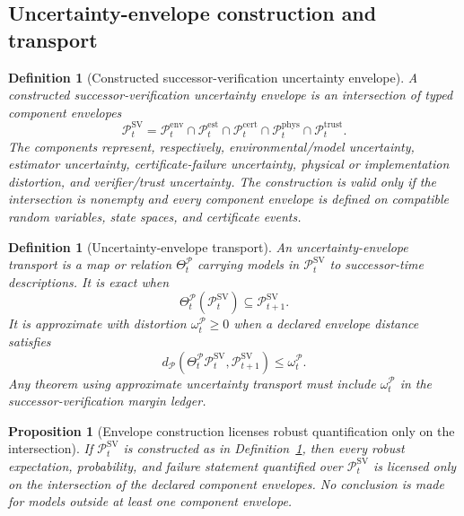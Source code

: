 \documentclass[11pt]{article}
\newtheorem{proposition}[theorem]{Proposition}
\newtheorem{definition}[theorem]{Definition}
\newcommand{\Pcal}{\mathcal{P}}
\newcommand{\1}{\mathbf{1}}
\begin{document}
\subsection{Uncertainty-envelope construction and transport}

\begin{definition}[Constructed successor-verification uncertainty envelope]
\label{def:batch12a_uncertainty_envelope_construction}
A constructed successor-verification uncertainty envelope is an intersection of typed component envelopes
\[
\Pcal_t^{\mathrm{SV}}
=
\Pcal_t^{\mathrm{env}}
\cap
\Pcal_t^{\mathrm{est}}
\cap
\Pcal_t^{\mathrm{cert}}
\cap
\Pcal_t^{\mathrm{phys}}
\cap
\Pcal_t^{\mathrm{trust}}.
\]
The components represent, respectively, environmental/model uncertainty, estimator uncertainty, certificate-failure uncertainty, physical or implementation distortion, and verifier/trust uncertainty.  The construction is valid only if the intersection is nonempty and every component envelope is defined on compatible random variables, state spaces, and certificate events.
\end{definition}

\begin{definition}[Uncertainty-envelope transport]
\label{def:batch12a_uncertainty_envelope_transport}
An uncertainty-envelope transport is a map or relation \(\Theta_t^{\Pcal}\) carrying models in \(\Pcal_t^{\mathrm{SV}}\) to successor-time descriptions.  It is exact when
\[
\Theta_t^{\Pcal}(\Pcal_t^{\mathrm{SV}})
\subseteq
\Pcal_{t+1}^{\mathrm{SV}}.
\]
It is approximate with distortion \(\omega_t^{\Pcal}\ge0\) when a declared envelope distance satisfies
\[
d_{\Pcal}(\Theta_t^{\Pcal}\Pcal_t^{\mathrm{SV}},\Pcal_{t+1}^{\mathrm{SV}})
\le
\omega_t^{\Pcal}.
\]
Any theorem using approximate uncertainty transport must include \(\omega_t^{\Pcal}\) in the successor-verification margin ledger.
\end{definition}

\begin{proposition}[Envelope construction licenses robust quantification only on the intersection]
\label{prop:batch12a_envelope_intersection_scope}
If \(\Pcal_t^{\mathrm{SV}}\) is constructed as in Definition~\ref{def:batch12a_uncertainty_envelope_construction}, then every robust expectation, probability, and failure statement quantified over \(\Pcal_t^{\mathrm{SV}}\) is licensed only on the intersection of the declared component envelopes.  No conclusion is made for models outside at least one component envelope.
\end{proposition}
\end{document}
